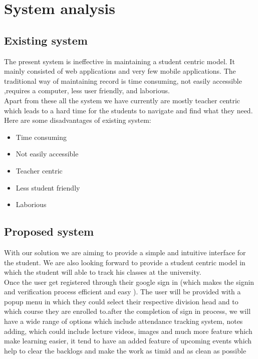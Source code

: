 \documentclass{article}
\begin{document}
\newpage


\newpage

\section{System analysis}
\hspace{1em}

\subsection{Existing system}

\Large
The present system is ineffective in maintaining a student centric model. It mainly consisted of web applications and very few mobile applications. The traditional way of maintaining record is time consuming, not easily accessible ,requires a computer, less user friendly, and laborious.\\

\Large
Apart from these all the system we have currently are mostly teacher centric which leads to a hard time for the students to navigate and find what they need.\\

\Large
Here are some disadvantages of existing system:
\begin{itemize}
\item Time consuming
\item Not easily accessible
\item Teacher centric
\item Less student friendly
\item Laborious
\end{itemize}

\vspace{1em}

\subsection{Proposed system}

\Large
With our solution we are aiming to provide a simple and intuitive interface for the student. We are also looking forward to provide a student centric model in which the student will able to track his classes at the university.\\

\Large
Once the user get registered through their google sign in (which makes the signin and verification process efficient and easy ). The user will be provided with a popup menu in which they could select their respective division head and to which course they are enrolled to.after the completion of sign in process, we will have a wide range of options which include attendance tracking system, notes adding, which could include lecture videos, images and much more feature which make learning easier, it tend to have an added feature of upcoming events which help to clear the backlogs and make the work as timid and as clean as possible\\
\end{document}
